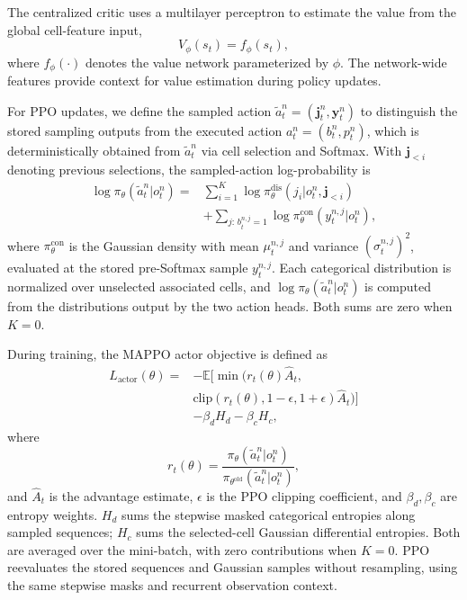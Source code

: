 \documentclass[journal]{IEEEtran}
\begin{document}
The centralized critic uses a multilayer perceptron to estimate the value from the global cell-feature input,
\begin{equation}
V_\phi(s_t)=f_\phi(s_t),
\end{equation}
where $f_\phi(\cdot)$ denotes the value network parameterized by $\phi$. The network-wide features provide context for value estimation during policy updates.

For PPO updates, we define the sampled action $\widetilde a_t^n=(\mathbf j_t^n,\mathbf y_t^n)$ to distinguish the stored sampling outputs from the executed action $a_t^n=(b_t^n,p_t^n)$, which is deterministically obtained from $\widetilde a_t^n$ via cell selection and Softmax. With $\mathbf j_{<i}$ denoting previous selections, the sampled-action log-probability is
\begin{equation}
\begin{aligned}
\log\pi_{\theta}(\widetilde a_t^n|o_t^n)
={}&\sum_{i=1}^{K}\log\pi_{\theta}^{\mathrm{dis}}(j_i|o_t^n,\mathbf j_{<i})\\
&+\sum_{j:\,b_t^{n,j}=1}\log\pi_{\theta}^{\mathrm{con}}(y_t^{n,j}|o_t^n),
\end{aligned}
\label{eq:mappo-joint-logprob}
\end{equation}
where $\pi_{\theta}^{\mathrm{con}}$ is the Gaussian density with mean $\mu_t^{n,j}$ and variance $(\sigma_t^{n,j})^2$, evaluated at the stored pre-Softmax sample $y_t^{n,j}$. Each categorical distribution is normalized over unselected associated cells, and $\log\pi_{\theta}(\widetilde a_t^n|o_t^n)$ is computed from the distributions output by the two action heads. Both sums are zero when $K=0$.

During training, the MAPPO actor objective is defined as
\begin{equation}
\begin{aligned}
L_{\mathrm{actor}}(\theta)={}&-\mathbb E\Big[
\min\big(r_t(\theta)\hat A_t,\\
&\mathrm{clip}(r_t(\theta),1-\epsilon,1+\epsilon)\hat A_t\big)
\Big]\\
&-\beta_d H_d-\beta_c H_c,
\end{aligned}
\label{eq:mappo-actor-loss}
\end{equation}
where
\begin{equation}
r_t(\theta)=
\frac{\pi_{\theta}(\widetilde a_t^n|o_t^n)}
{\pi_{\theta^{\mathrm{old}}}(\widetilde a_t^n|o_t^n)},
\end{equation}
and $\hat A_t$ is the advantage estimate, $\epsilon$ is the PPO clipping coefficient, and $\beta_d,\beta_c$ are entropy weights. $H_d$ sums the stepwise masked categorical entropies along sampled sequences; $H_c$ sums the selected-cell Gaussian differential entropies. Both are averaged over the mini-batch, with zero contributions when $K=0$. PPO reevaluates the stored sequences and Gaussian samples without resampling, using the same stepwise masks and recurrent observation context.
\end{document}
